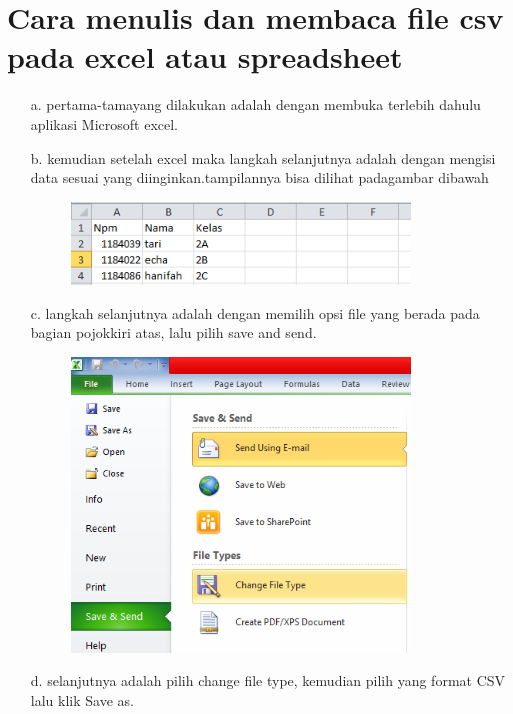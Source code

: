 \section{Cara menulis dan membaca file csv pada excel atau spreadsheet}
\begin{enumerate}
    \item [a.]pertama-tamayang dilakukan adalah dengan membuka terlebih dahulu aplikasi Microsoft excel.
    \newpage
    \item[b.]kemudian setelah excel maka langkah selanjutnya adalah dengan mengisi data sesuai yang diinginkan.tampilannya bisa dilihat padagambar dibawah
     \begin{figure}[!htbp]
    \begin{center}
    \includegraphics[width=9cm]{gambar/2.png}
    \end{center}   
    \end{figure}
    \item[c.]langkah selanjutnya adalah dengan memilih opsi file yang berada pada bagian pojokkiri atas, lalu pilih save and send.
     \begin{figure}[!htbp]
    \begin{center}
    \includegraphics[width=9cm]{gambar/3.png}
    \end{center}   
    \end{figure}
    \newpage
    \item[d.]selanjutnya adalah pilih change file type, kemudian  pilih yang format CSV lalu klik Save as.
     \begin{figure}[!htbp]

\end{figure}
\end{enumerate}
